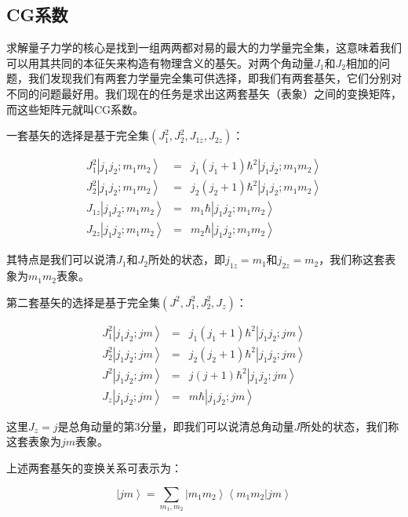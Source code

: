 \subsection{CG系数}

求解量子力学的核心是找到一组两两都对易的最大的力学量完全集，这意味着我们可以用其共同的本征矢来构造有物理含义的基矢。对两个角动量$J_1$和$J_2$相加的问题，我们发现我们有两套力学量完全集可供选择，即我们有两套基矢，它们分别对不同的问题最好用。我们现在的任务是求出这两套基矢（表象）之间的变换矩阵，而这些矩阵元就叫CG系数。

一套基矢的选择是基于完全集$( J_1^2, J_2^2, J_{1z}, J_{2z}  )$：

\begin{eqnarray}
J_1^2 \left|j_1 j_2 ; m_1 m_2 \right\rangle & = &  j_1 (j_1 +1 )\hbar^2  \left|j_1 j_2 ; m_1 m_2 \right\rangle \\
J_2^2 \left|j_1 j_2 ; m_1 m_2 \right\rangle & = &  j_2 (j_2 +1 )\hbar^2  \left|j_1 j_2 ; m_1 m_2 \right\rangle \\
J_{1z} \left|j_1 j_2 ; m_1 m_2 \right\rangle & = & m_1 \hbar \left|j_1 j_2 ; m_1 m_2 \right\rangle \\
J_{2z} \left|j_1 j_2 ; m_1 m_2 \right\rangle & = & m_2 \hbar \left|j_1 j_2 ; m_1 m_2 \right\rangle
\end{eqnarray}

其特点是我们可以说清$J_1$和$J_2$所处的状态，即$j_{1z} = m_1$和$j_{2z} = m_2$，我们称这套表象为$m_1 m_2$表象。

第二套基矢的选择是基于完全集$( J^2, J_1^2, J_2^2, J_z )$：

\begin{eqnarray}
J_1^2 \left|j_1 j_2 ; jm \right\rangle & = &  j_1 (j_1 +1 )\hbar^2  \left|j_1 j_2 ; jm \right\rangle \\
J_2^2 \left|j_1 j_2 ; jm \right\rangle & = &  j_2 (j_2 +1 )\hbar^2  \left|j_1 j_2 ; jm \right\rangle \\
J^2 \left|j_1 j_2 ; jm \right\rangle & = & j (j + 1) \hbar^2 \left|j_1 j_2 ; jm \right\rangle \\ 
J_{z} \left|j_1 j_2 ; jm \right\rangle & = & m \hbar \left|j_1 j_2 ; jm \right\rangle
\end{eqnarray}

这里$J_z = j$是总角动量的第3分量，即我们可以说清总角动量$J$所处的状态，我们称这套表象为$jm$表象。

上述两套基矢的变换关系可表示为：

\begin{equation}
\left| jm \right\rangle = \sum\limits_{m_1, m_2} \left|  m_1 m_2  \right\rangle \left\langle m_1 m_2 | j m \right\rangle
\end{equation}

